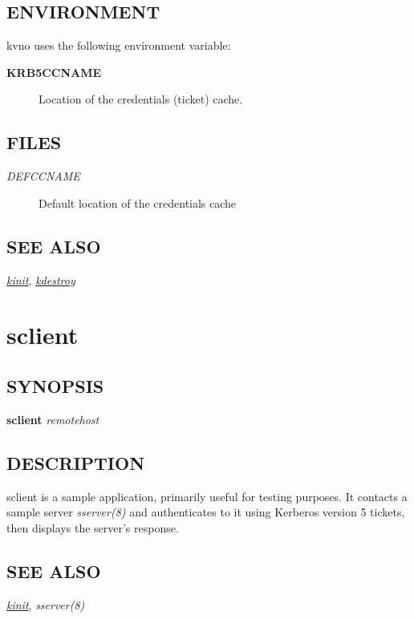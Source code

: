 \documentclass[letterpaper,10pt,english]{sphinxmanual}
\begin{document}
\subsection{ENVIRONMENT}
\label{user/user_commands/kvno:environment}
kvno uses the following environment variable:
\begin{description}
\item[{\textbf{KRB5CCNAME}}] \leavevmode
Location of the credentials (ticket) cache.

\end{description}


\subsection{FILES}
\label{user/user_commands/kvno:files}\begin{description}
\item[{\emph{DEFCCNAME}}] \leavevmode
Default location of the credentials cache

\end{description}


\subsection{SEE ALSO}
\label{user/user_commands/kvno:see-also}
{\hyperref[user/user_commands/kinit:kinit-1]{\emph{kinit}}}, {\hyperref[user/user_commands/kdestroy:kdestroy-1]{\emph{kdestroy}}}


\section{sclient}
\label{user/user_commands/sclient:sclient}\label{user/user_commands/sclient::doc}\label{user/user_commands/sclient:sclient-1}

\subsection{SYNOPSIS}
\label{user/user_commands/sclient:synopsis}
\textbf{sclient} \emph{remotehost}


\subsection{DESCRIPTION}
\label{user/user_commands/sclient:description}
sclient is a sample application, primarily useful for testing
purposes.  It contacts a sample server \emph{sserver(8)} and
authenticates to it using Kerberos version 5 tickets, then displays
the server's response.


\subsection{SEE ALSO}
\label{user/user_commands/sclient:see-also}
{\hyperref[user/user_commands/kinit:kinit-1]{\emph{kinit}}}, \emph{sserver(8)}



\renewcommand{\indexname}{Index}
\printindex
\end{document}
